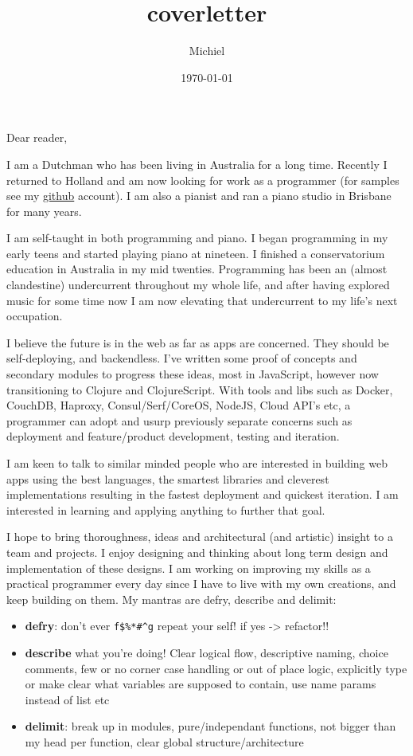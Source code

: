 \documentclass[11pt]{article}
\author{Michiel}
\date{\today}
\title{coverletter}
\begin{document}
\maketitle
\tableofcontents

Dear reader,

I am a Dutchman who has been living in Australia for a long time. Recently I
returned to Holland and am now looking for work as a programmer (for samples see
my \href{http://github.com/michieljoris}{github} account). I am also a pianist and ran a piano studio in Brisbane for
many years.

I am self-taught in both programming and piano. I began programming in my early teens and started playing piano at nineteen. I finished a conservatorium education in Australia in my mid twenties. Programming has been an (almost clandestine) undercurrent throughout my whole life, and after having explored music for some time now I am now elevating that undercurrent to my life's next occupation.

I believe the future is in the web as far as apps are concerned. They should be
self-deploying, and backendless. I've written some proof of concepts and
secondary modules to progress these ideas, most in JavaScript, however now
transitioning to Clojure and ClojureScript. With tools and libs such as Docker,
CouchDB, Haproxy, Consul/Serf/CoreOS, NodeJS, Cloud API's etc, a programmer can
adopt and usurp previously separate concerns such as deployment and
feature/product development, testing and iteration.

I am keen to talk to similar minded people who are interested in building web apps using the best languages, the smartest libraries and cleverest implementations resulting in the fastest deployment and quickest iteration. I am interested in learning and applying anything to further that goal. 

I hope to bring thoroughness, ideas and architectural (and artistic) insight to a team and projects. I enjoy designing and thinking about long term design and implementation of these designs. I am working on improving my skills as a practical programmer every day since I have to live with my own creations, and keep building on them. My mantras are defry, describe and delimit:
\vspace{3mm} %
\renewcommand{\labelitemi}{\textbullet}

\begin{itemize}
\item \textbf{defry}: don't ever \verb~f$%*#^g~ repeat your self!
if yes -> refactor!!
\item \textbf{describe} what you're doing!
Clear logical flow, descriptive naming, choice comments, few or no corner case handling or out of place logic, explicitly type or make clear what variables are supposed to contain, use name params instead of list etc
\item \textbf{delimit}: break up in modules, pure/independant functions, not bigger than my head per function, clear global structure/architecture
\end{itemize}
\end{document}
